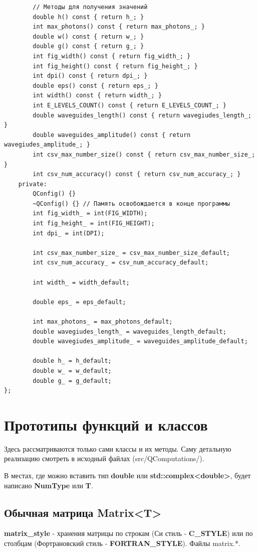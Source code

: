 \documentclass[12pt,fleqn]{article}
\begin{document}
\begin{mdframed}[linecolor=black, topline=true, bottomline=true,
    leftline=false, rightline=false]
\begin{verbatim}
        // Методы для получения значений
        double h() const { return h_; }
        int max_photons() const { return max_photons_; }
        double w() const { return w_; }
        double g() const { return g_; }
        int fig_width() const { return fig_width_; }
        int fig_height() const { return fig_height_; }
        int dpi() const { return dpi_; }
        double eps() const { return eps_; }
        int width() const { return width_; }
        int E_LEVELS_COUNT() const { return E_LEVELS_COUNT_; }
        double waveguides_length() const { return wavegiudes_length_; }
        double waveguides_amplitude() const { return wavegiudes_amplitude_; }
        int csv_max_number_size() const { return csv_max_number_size_; }
        int csv_num_accuracy() const { return csv_num_accuracy_; }
    private:
        QConfig() {}
        ~QConfig() {} // Память освобождается в конце программы
        int fig_width_ = int(FIG_WIDTH);
        int fig_height_ = int(FIG_HEIGHT);
        int dpi_ = int(DPI);
        
        int csv_max_number_size_ = csv_max_number_size_default;
        int csv_num_accuracy_ = csv_num_accuracy_default;

        int width_ = width_default;

        double eps_ = eps_default;
        
        int max_photons_ = max_photons_default;
        double wavegiudes_length_ = waveguides_length_default;
        double wavegiudes_amplitude_ = waveguides_amplitude_default;
    
        double h_ = h_default;
        double w_ = w_default;
        double g_ = g_default;
};
\end{verbatim}
\end{mdframed}
    \section{Прототипы функций и классов}

        Здесь рассматриваются только сами классы и их методы. Саму детальную реализацию смотреть в исходный файлах (\textsf{src/QComputations/}).

        В местах, где можно вставить тип \textbf{double} или \textbf{std::complex<double>}, будет написано \textbf{NumType} или \textbf{T}.

        \subsection{Обычная матрица \textbf{Matrix<T>}}
        \textbf{matrix\_style} - хранения матрицы по строкам (Си стиль - \textbf{C\_STYLE}) или по столбцам (Фортрановский стиль - \textbf{FORTRAN\_STYLE}).
        Файлы \textsf{matrix.*}.
\end{document}
